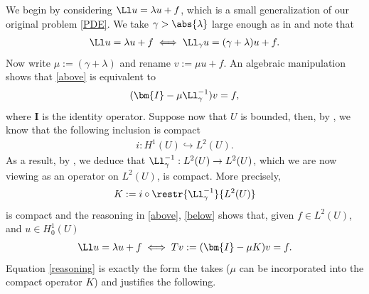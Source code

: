 \documentclass[
    a4paper,
    DIV=14,
    abstract=true,
    numbers=noenddot
]{scrartcl}
\begin{document}
We begin by considering $\Ll u =\lambda u+f$, which is a small generalization of our original problem \eqref{PDE}. We take $\gamma > \abs{\lambda }$ large enough as in  and note that
\begin{align}\label{above}
    \Ll u = \lambda u + f \iff \Ll_\gamma u =(\gamma+\lambda)u +f.
\end{align}
Now write $\mu:=(\gamma+\lambda)$ and rename $v:=\mu u +f$. An algebraic manipulation shows that \eqref{above} is equivalent to
\begin{align}\label{below}
    (\bm{I}- \mu \Ll_\gamma ^{-1} )v =f,
\end{align}
where $\bm{I}$ is the identity operator. Suppose now that $U$ is bounded, then, by , we know that the following inclusion is compact
\begin{align*}
    i: H^1(U) \hookrightarrow L^2(U).
\end{align*}
As a result, by , we deduce that $\Ll_\gamma^{-1}: L^2(U) \to L^2(U)$, which we are now viewing as an operator on $L^2(U)$, is compact. More precisely,
\begin{align*}
    K:= i \circ \restr{\Ll_\gamma ^{-1}}{L^2(U)}
\end{align*}
is compact and the reasoning in \eqref{above}, \eqref{below} shows that, given $f \in L^2(U)$, and $u \in H_0^1(U)$
\begin{align}\label{reasoning}
    \Ll u = \lambda u+f\iff Tv:=(\bm{I}-\mu K)v =f.
\end{align}
Equation \eqref{reasoning} is exactly the form the  takes ($\mu $ can be incorporated into  the compact operator $K$) and justifies the following.
\end{document}

